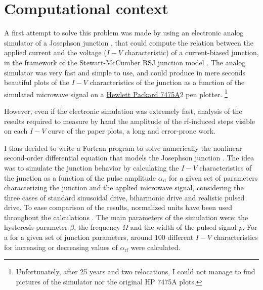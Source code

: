 \section{Computational context}
\label{computational-context}

A first attempt to solve this problem was made by using an electronic analog simulator of a Josephson junction \cite {Henry:1981}, that could compute the relation between the applied current and the voltage ($I-V$ characteristic) of a current-biased junction, in the framework of the Stewart-McCumber RSJ junction model \cite{McCumber:1968, Stewart:1974}.
The analog simulator was very fast and simple to use, and could produce in mere seconds beautiful plots of the $I-V$ characteristics of the junction as a function of the simulated microwave signal on a \href{http://www.hpmuseum.net/display_item.php?hw=74}{Hewlett Packard 7475A}2 pen plotter.
\footnote{Unfortunately, after 25 years and two relocations, I could not manage to find pictures of the simulator nor the original HP 7475A plots.} 

However, even if the electronic simulation was extremely fast, analysis of the results required to measure by hand the amplitude of the rf-induced steps visible on each $I-V$ curve of the paper plots, a long and error-prone work.

I thus decided to write a Fortran program to solve numerically the nonlinear second-order differential equation that models the Josephson junction \cite{McCumber:1968, Stewart:1974}. 
The idea was to simulate the junction behavior by calculating the $I-V$ characteristics of the junction as a function of the pulse amplitude $\alpha_\mathrm{rf}$ for a given set of parameters characterizing the junction and the applied microwave signal, considering the three cases of standard sinusoidal drive, biharmonic drive and realistic pulsed drive. 
To ease comparison of the results, normalized units have been used throughout the calculations \cite{McCumber:1968, Stewart:1974}.
The main parameters of the simulation were: the hysteresis parameter $\beta$, the frequency $\Omega$ and the width of the pulsed signal $\rho$. 
For a for a given set of junction parameters, around $100$ different $I-V$ characteristics for increasing or decreasing values of $\alpha_\mathrm{rf}$ were calculated.


